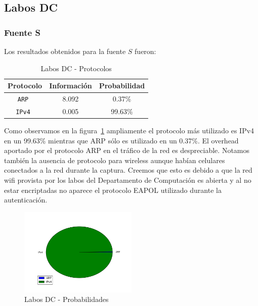 \documentclass[final,inline,narroweqnarray,a4paper]{ieee}
\begin{document}
\subsection{Labos DC}
\subsubsection{Fuente S}

Los resultados obtenidos para la fuente $S$ fueron:

\begin{table}[H]
    \begin{center}
        \begin{tabular}{|c|c|c|}
            \hline
            \textbf{Protocolo} & \textbf{Información} & \textbf{Probabilidad} \\ \hline
            \texttt{ARP       }& 8.092        & 0.37\%     \\ \hline
            \texttt{IPv4      }& 0.005        & 99.63\%    \\ \hline
        \end{tabular}
        \caption{Labos DC - Protocolos}
        \label{table:labosDcS}
    \end{center}
\end{table} 

Como observamos en la figura~\ref{torta:labosDcS} ampliamente el protocolo más utilizado es IPv4 en un 99.63\% mientras que ARP sólo es utilizado en un 0.37\%. 
El overhead aportado por el protocolo ARP en el tráfico de la red es despreciable.
Notamos también la ausencia de protocolo para wireless aunque habían celulares conectados a la red durante la captura. Creemos que esto es debido a que la red wifi provista por los labos del Departamento de Computación es abierta y al no estar encriptadas no aparece el protocolo EAPOL utilizado durante la autenticación. 

\begin{figure}[H]
    \begin{center}
        \includegraphics[width=0.5\textwidth]{plot/laboDcS-pie.png}
        \caption{Labos DC - Probabilidades}
        \label{torta:labosDcS}
    \end{center}
\end{figure}
\end{document}
